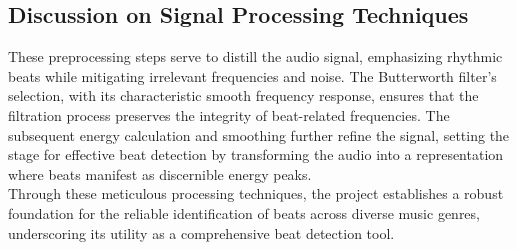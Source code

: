 \subsection{Discussion on Signal Processing Techniques}

These preprocessing steps serve to distill the audio signal, emphasizing rhythmic beats while mitigating irrelevant frequencies and noise. The Butterworth filter's selection, with its characteristic smooth frequency response, ensures that the filtration process preserves the integrity of beat-related frequencies. The subsequent energy calculation and smoothing further refine the signal, setting the stage for effective beat detection by transforming the audio into a representation where beats manifest as discernible energy peaks. \\

Through these meticulous processing techniques, the project establishes a robust foundation for the reliable identification of beats across diverse music genres, underscoring its utility as a comprehensive beat detection tool.
